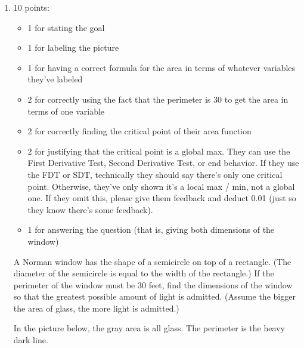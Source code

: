 \documentclass{article}
\begin{document}
\begin{enumerate}
\item \label{spring2011-midterm1-revisit-5}

  \begin{grading}
    10 points:
    \begin{itemize}[nosep]
    \item 1 for stating the goal
    \item 1 for labeling the picture
    \item 1 for having a correct formula for the area in terms of whatever variables they've labeled
    \item 2 for correctly using the fact that the perimeter is 30 to get the area in terms of one variable
    \item 2 for correctly finding the critical point of their area function
    \item 2 for justifying that the critical point is a global max. They can use the First Derivative Test, Second Derivative Test, or end behavior. If they use the FDT or SDT, technically they should say there's only one critical point. Otherwise, they've only shown it's a local max / min, not a global one. If they omit this, please give them feedback and deduct 0.01 (just so they know there's some feedback). 
    \item 1 for answering the question (that is, giving both dimensions of the window)
    \end{itemize}
  \end{grading}

  \begin{problem}[\newpage]
    A Norman window has the shape of a semicircle on top of a rectangle. (The diameter of the semicircle is equal to the width of the rectangle.) If the perimeter of the window must be 30 feet, find the dimensions of the window so that the greatest possible amount of light is admitted. (Assume the bigger the area of glass, the more light is admitted.)

    In the picture below, the gray area is all glass. The perimeter is the heavy dark line.

  \end{problem}


\end{enumerate}
\end{document}
